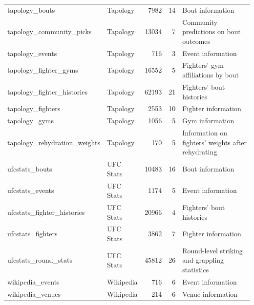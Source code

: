 \documentclass[12pt,twoside]{report}
\begin{document}
\begin{longtable}{llrrl}
tapology\_bouts                         & Tapology        & 7982    & 14         & Bout information                                       \\
tapology\_community\_picks              & Tapology        & 13034   & 7          & Community predictions on bout outcomes                 \\
tapology\_events                        & Tapology        & 716     & 3          & Event information                                      \\
tapology\_fighter\_gyms                 & Tapology        & 16552   & 5          & Fighters' gym affiliations by bout                     \\
tapology\_fighter\_histories            & Tapology        & 62193   & 21         & Fighters' bout histories                               \\
tapology\_fighters                      & Tapology        & 2553    & 10         & Fighter information                                    \\
tapology\_gyms                          & Tapology        & 1056    & 5          & Gym information                                        \\
tapology\_rehydration\_weights          & Tapology        & 170     & 5          & Information on fighters' weights after rehydrating     \\
ufcstats\_bouts                         & UFC Stats       & 10483   & 16         & Bout information                                       \\
ufcstats\_events                        & UFC Stats       & 1174    & 5          & Event information                                      \\
ufcstats\_fighter\_histories            & UFC Stats       & 20966   & 4          & Fighters' bout histories                               \\
ufcstats\_fighters                      & UFC Stats       & 3862    & 7          & Fighter information                                    \\
ufcstats\_round\_stats                  & UFC Stats       & 45812   & 26         & Round-level striking and grappling statistics          \\
wikipedia\_events                       & Wikipedia       & 716     & 6          & Event information                                      \\
wikipedia\_venues                       & Wikipedia       & 214     & 6          & Venue information                                      \\
\bottomrule
\end{longtable}
\normalsize
\end{document}
